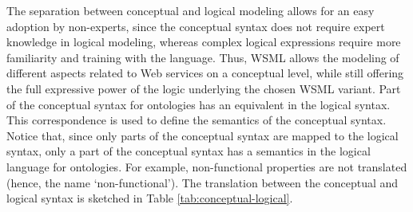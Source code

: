 The separation between conceptual and logical modeling allows for an
easy adoption by non-experts, since the conceptual syntax does not
require expert knowledge in logical modeling, whereas complex
logical expressions require more familiarity and training with the
language. Thus, WSML allows the modeling of different aspects
related to Web services on a conceptual level, while still offering
the full expressive power of the logic underlying the chosen WSML
variant. Part of the conceptual syntax for ontologies has an
equivalent in the logical syntax. This correspondence is used to
define the semantics of the conceptual syntax. Notice that, since
only parts of the conceptual syntax are mapped to the logical
syntax, only a part of the conceptual syntax has a semantics in the
logical language for ontologies. For example, non-functional
properties are not translated (hence, the name `non-functional').
The translation between the conceptual and logical syntax is
sketched in Table \ref{tab:conceptual-logical}.

